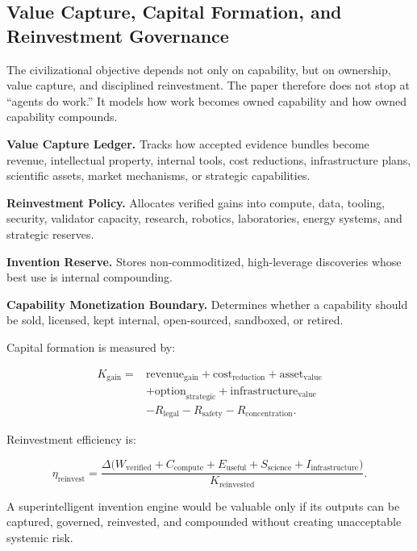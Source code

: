 \documentclass[
  11pt,
]{article}
\begin{document}
\subsection{Value Capture, Capital Formation, and Reinvestment
Governance}\label{value-capture-capital-formation-and-reinvestment-governance}

The civilizational objective depends not only on capability, but on
ownership, value capture, and disciplined reinvestment. The paper
therefore does not stop at ``agents do work.'' It models how work
becomes owned capability and how owned capability compounds.

\textbf{Value Capture Ledger.} Tracks how accepted evidence bundles
become revenue, intellectual property, internal tools, cost reductions,
infrastructure plans, scientific assets, market mechanisms, or strategic
capabilities.

\textbf{Reinvestment Policy.} Allocates verified gains into compute,
data, tooling, security, validator capacity, research, robotics,
laboratories, energy systems, and strategic reserves.

\textbf{Invention Reserve.} Stores non-commoditized, high-leverage
discoveries whose best use is internal compounding.

\textbf{Capability Monetization Boundary.} Determines whether a
capability should be sold, licensed, kept internal, open-sourced,
sandboxed, or retired.

Capital formation is measured by:

\[
\begin{aligned}
K_{\mathrm{gain}}={}&
\mathrm{revenue}_{\mathrm{gain}}
+\mathrm{cost}_{\mathrm{reduction}}
+\mathrm{asset}_{\mathrm{value}} \\
&+\mathrm{option}_{\mathrm{strategic}}
+\mathrm{infrastructure}_{\mathrm{value}} \\
&-R_{\mathrm{legal}}-R_{\mathrm{safety}}-R_{\mathrm{concentration}}.
\end{aligned}
\]

Reinvestment efficiency is:

\[
\eta_{\mathrm{reinvest}}
=
\frac{
\Delta\!\big(W_{\mathrm{verified}}+C_{\mathrm{compute}}+E_{\mathrm{useful}}
+S_{\mathrm{science}}+I_{\mathrm{infrastructure}}\big)
}{K_{\mathrm{reinvested}}}.
\]

A superintelligent invention engine would be valuable only if its
outputs can be captured, governed, reinvested, and compounded without
creating unacceptable systemic risk.
\end{document}
